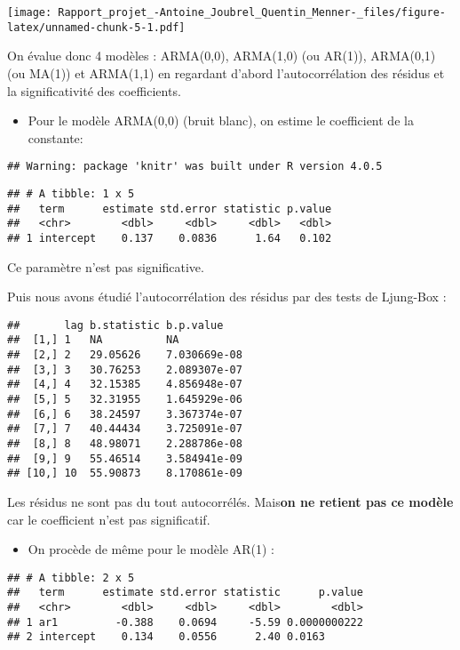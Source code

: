 \documentclass[
  landscape]{article}
\providecommand{\tightlist}{%
  \setlength{\itemsep}{0pt}\setlength{\parskip}{0pt}}
\begin{document}
\texttt{[image: Rapport\_projet\_-Antoine\_Joubrel\_Quentin\_Menner-\_files/figure-latex/unnamed-chunk-5-1.pdf]}

On évalue donc 4 modèles : ARMA(0,0), ARMA(1,0) (ou AR(1)), ARMA(0,1)
(ou MA(1)) et ARMA(1,1) en regardant d'abord l'autocorrélation des
résidus et la significativité des coefficients.

\begin{itemize}
\tightlist
\item
  Pour le modèle ARMA(0,0) (bruit blanc), on estime le coefficient de la
  constante:
\end{itemize}

\begin{verbatim}
## Warning: package 'knitr' was built under R version 4.0.5
\end{verbatim}

\begin{verbatim}
## # A tibble: 1 x 5
##   term      estimate std.error statistic p.value
##   <chr>        <dbl>     <dbl>     <dbl>   <dbl>
## 1 intercept    0.137    0.0836      1.64   0.102
\end{verbatim}

Ce paramètre n'est pas significative.

Puis nous avons étudié l'autocorrélation des résidus par des tests de
Ljung-Box :

\begin{verbatim}
##       lag b.statistic b.p.value   
##  [1,] 1   NA          NA          
##  [2,] 2   29.05626    7.030669e-08
##  [3,] 3   30.76253    2.089307e-07
##  [4,] 4   32.15385    4.856948e-07
##  [5,] 5   32.31955    1.645929e-06
##  [6,] 6   38.24597    3.367374e-07
##  [7,] 7   40.44434    3.725091e-07
##  [8,] 8   48.98071    2.288786e-08
##  [9,] 9   55.46514    3.584941e-09
## [10,] 10  55.90873    8.170861e-09
\end{verbatim}

Les résidus ne sont pas du tout autocorrélés. Mais\textbf{on ne retient
pas ce modèle} car le coefficient n'est pas significatif.

\begin{itemize}
\tightlist
\item
  On procède de même pour le modèle AR(1) :
\end{itemize}

\begin{verbatim}
## # A tibble: 2 x 5
##   term      estimate std.error statistic      p.value
##   <chr>        <dbl>     <dbl>     <dbl>        <dbl>
## 1 ar1         -0.388    0.0694     -5.59 0.0000000222
## 2 intercept    0.134    0.0556      2.40 0.0163
\end{verbatim}
\end{document}
